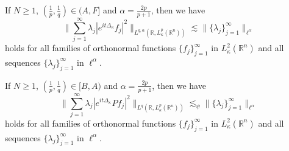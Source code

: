 \documentclass[10pt,a4paper]{amsart}
\begin{document}
\begin{theorem} \label{Lorentz-refined}
If $N\geq 1$, $(\frac{1}{p},\frac{1}{q})\in (A,F]$ and $\alpha=\frac{2p}{p+1}$, then we have
\begin{equation*}
			\bigg\|\sum_{j=1}^\infty \lambda_j|e^{it\Delta_\kappa}f_j|^2\bigg\|_{L^{q,\alpha}(\mathbb{R}, L_\kappa^p(\mathbb{R}^n))}\lesssim \|\{\lambda_j\}^\infty_{j=1}\|_{\ell^{\alpha}} 
\end{equation*}	
  holds for all families of orthonormal functions $\{f_j\}_{j=1}^\infty$ in $L_\kappa^2(\mathbb{R}^n)$ and all sequences $\{\lambda_j\}^\infty_{j=1}$ in $\ell^{\alpha}$. 
\end{theorem}

\begin{theorem} \label{adimissible}
If $N\geq 1$, $(\frac{1}{p},\frac{1}{q})\in [B,A)$ and $\alpha=\frac{2p}{p+1}$, then we have
\begin{equation*}
			\bigg\|\sum_{j=1}^\infty \lambda_j|e^{it\Delta_\kappa}Pf_j|^2\bigg\|_{L^q(\mathbb{R}, L_\kappa^p(\mathbb{R}^n))}\lesssim_\psi \|\{\lambda_j\}^\infty_{j=1}\|_{\ell^{\alpha}} 
\end{equation*}	
  holds for all families of orthonormal functions $\{f_j\}_{j=1}^\infty$ in $L_\kappa^2(\mathbb{R}^n)$ and all sequences $\{\lambda_j\}^\infty_{j=1}$ in $\ell^{\alpha}$. 
\end{theorem}
\end{document}
